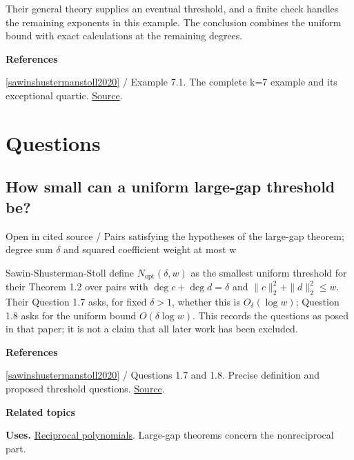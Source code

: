 \documentclass[11pt,a4paper,oneside,openany]{book}
\newenvironment{sources}{\par\smallskip\begingroup\footnotesize\color{atlasgray}\leftskip=10pt\setlength{\parskip}{2pt}}{\par\endgroup\smallskip}
\begin{document}
\color{black} Their general theory supplies an eventual threshold, and a finite check handles the remaining exponents in this example. The conclusion combines the uniform bound with exact calculations at the remaining degrees.\par
\begin{sources}
\textbf{References}\par\smallskip
\noindent\hyperlink{ref:sawinshustermanstoll2020}{[sawinshustermanstoll2020]} / Example 7.1. The complete k=7 example and its exceptional quartic. \href{https://arxiv.org/abs/1803.10811}{Source}.\par
\end{sources}\color{black}
\section*{Questions}
\subsection*{How small can a uniform large-gap threshold be?}
{\small\sffamily\color{atlasgold}Open in cited source / Pairs satisfying the hypotheses of the large-gap theorem; degree sum \ensuremath{\delta} and squared coefficient weight at most w}\par\smallskip
\color{black} Sawin-Shusterman-Stoll define \(N_{\mathrm{opt}}(\delta,w)\) as the smallest uniform threshold for their Theorem 1.2 over pairs with \(\deg c+\deg d=\delta\) and \(\|c\|_2^2+\|d\|_2^2\le w\). Their Question 1.7 asks, for fixed \(\delta>1\), whether this is \(O_\delta(\log w)\); Question 1.8 asks for the uniform bound \(O(\delta\log w)\). This records the questions as posed in that paper; it is not a claim that all later work has been excluded.\par
\begin{sources}
\textbf{References}\par\smallskip
\noindent\hyperlink{ref:sawinshustermanstoll2020}{[sawinshustermanstoll2020]} / Questions 1.7 and 1.8. Precise definition and proposed threshold questions. \href{https://arxiv.org/abs/1803.10811}{Source}.\par
\end{sources}\color{black}
\par\medskip\begingroup\footnotesize\setlength{\parskip}{1pt}\textbf{\sffamily\color{atlasgreen}Related topics}\par
\color{black}\textbf{Uses.} \hyperlink{article:reciprocity}{Reciprocal polynomials}. Large-gap theorems concern the nonreciprocal part.\par
\end{document}
